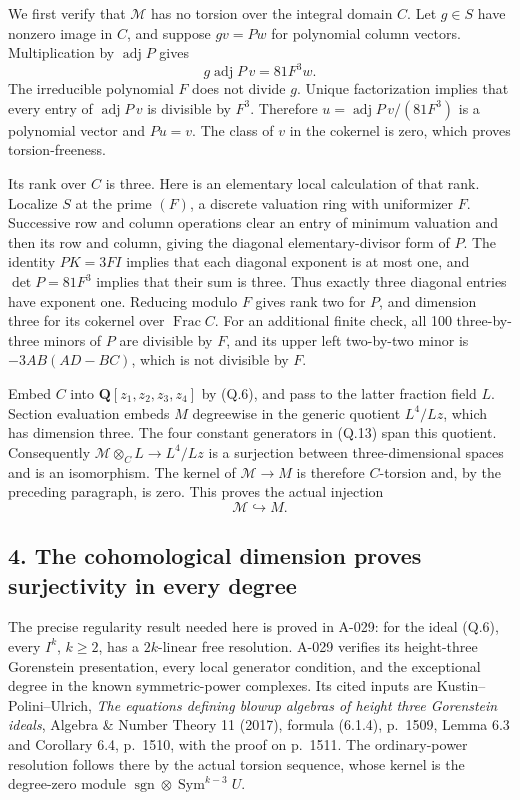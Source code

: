 \documentclass[
  10pt,
]{article}
\begin{document}
We first verify that \(\mathcal M\) has no torsion over the integral
domain \(C\). Let \(g\in S\) have nonzero image in \(C\), and suppose
\(gv=Pw\) for polynomial column vectors. Multiplication by
\(\operatorname{adj}P\) gives \[
g\operatorname{adj}P\,v=81F^3w.
\] The irreducible polynomial \(F\) does not divide \(g\). Unique
factorization implies that every entry of \(\operatorname{adj}P\,v\) is
divisible by \(F^3\). Therefore \(u=\operatorname{adj}P\,v/(81F^3)\) is
a polynomial vector and \(Pu=v\). The class of \(v\) in the cokernel is
zero, which proves torsion-freeness.

Its rank over \(C\) is three. Here is an elementary local calculation of
that rank. Localize \(S\) at the prime \((F)\), a discrete valuation
ring with uniformizer \(F\). Successive row and column operations clear
an entry of minimum valuation and then its row and column, giving the
diagonal elementary-divisor form of \(P\). The identity \(PK=3FI\)
implies that each diagonal exponent is at most one, and \(\det P=81F^3\)
implies that their sum is three. Thus exactly three diagonal entries
have exponent one. Reducing modulo \(F\) gives rank two for \(P\), and
dimension three for its cokernel over \(\operatorname{Frac}C\). For an
additional finite check, all 100 three-by-three minors of \(P\) are
divisible by \(F\), and its upper left two-by-two minor is
\(-3AB(AD-BC)\), which is not divisible by \(F\).

Embed \(C\) into \(\mathbf Q[z_1,z_2,z_3,z_4]\) by (Q.6), and pass to
the latter fraction field \(L\). Section evaluation embeds \(M\)
degreewise in the generic quotient \(L^4/Lz\), which has dimension
three. The four constant generators in (Q.13) span this quotient.
Consequently \(\mathcal M\otimes_C L\to L^4/Lz\) is a surjection between
three-dimensional spaces and is an isomorphism. The kernel of
\(\mathcal M\to M\) is therefore \(C\)-torsion and, by the preceding
paragraph, is zero. This proves the actual injection \[
\mathcal M\hookrightarrow M.
\tag{Q.14}
\]

\subsection{4. The cohomological dimension proves surjectivity in every
degree}\label{the-cohomological-dimension-proves-surjectivity-in-every-degree}

The precise regularity result needed here is proved in A-029: for the
ideal (Q.6), every \(I^k\), \(k\ge2\), has a \(2k\)-linear free
resolution. A-029 verifies its height-three Gorenstein presentation,
every local generator condition, and the exceptional degree in the known
symmetric-power complexes. Its cited inputs are Kustin--Polini--Ulrich,
\emph{The equations defining blowup algebras of height three Gorenstein
ideals}, Algebra \& Number Theory 11 (2017), formula (6.1.4), p.~1509,
Lemma 6.3 and Corollary 6.4, p.~1510, with the proof on p.~1511. The
ordinary-power resolution follows there by the actual torsion sequence,
whose kernel is the degree-zero module
\(\operatorname{sgn}\otimes\operatorname{Sym}^{k-3}U\).
\end{document}
